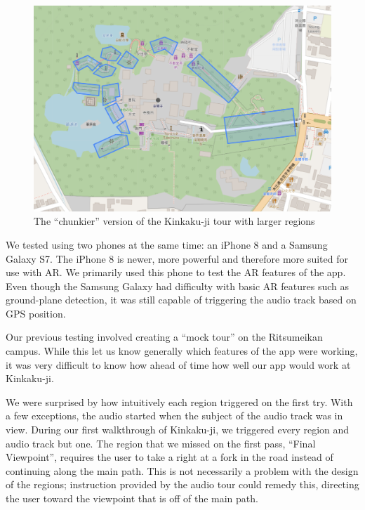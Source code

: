 \documentclass[a4paper, 10pt, american, titlepage]{article}
\begin{document}
\begin{figure}[h]
	\centering
	\includegraphics[width=\textwidth]{kinkakuji-chunkier-tour.png}
	\caption[The ``chunkier'' version of the Kinkaku-ji tour]{The ``chunkier''
		version of the Kinkaku-ji tour with larger regions}
	\label{fig:kinkakujiChunkierTour}
\end{figure}

We tested using two phones at the same time: an iPhone 8 and a Samsung Galaxy
S7. The iPhone 8 is newer, more powerful and therefore more suited for use with
AR. We primarily used this phone to test the AR features of the app. Even
though the Samsung Galaxy had difficulty with basic AR features such as
ground-plane detection, it was still capable of triggering the audio track
based on GPS position.

Our previous testing involved creating a ``mock tour'' on the Ritsumeikan
campus. While this let us know generally which features of the app were working,
it was very difficult to know how ahead of time how well our app would work at
Kinkaku-ji.

We were surprised by how intuitively each region triggered on the first try.
With a few exceptions, the audio started when the subject of the audio track
was in view. During our first walkthrough of Kinkaku-ji, we triggered every
region and audio track but one. The region that we missed on the first pass,
``Final Viewpoint'', requires the user to take a right at a fork in the road
instead of continuing along the main path. This is not necessarily a problem
with the design of the regions; instruction provided by the audio tour could
remedy this, directing the user toward the viewpoint that is off of the main
path.
\end{document}
